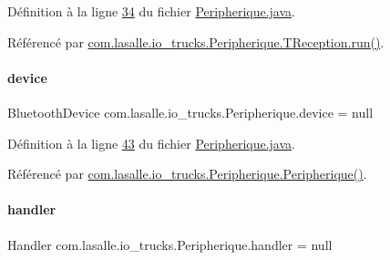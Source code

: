 Définition à la ligne \hyperlink{_peripherique_8java_source_l00034}{34} du fichier \hyperlink{_peripherique_8java_source}{Peripherique.\+java}.



Référencé par \hyperlink{_peripherique_8java_source_l00272}{com.\+lasalle.\+io\+\_\+trucks.\+Peripherique.\+T\+Reception.\+run()}.

\mbox{\label{classcom_1_1lasalle_1_1io__trucks_1_1_peripherique_aa42a263edf31850160d722219115a0ea}} 
\paragraph{\texorpdfstring{device}{device}}
{\footnotesize\ttfamily Bluetooth\+Device com.\+lasalle.\+io\+\_\+trucks.\+Peripherique.\+device = null\hspace{0.3cm}{\ttfamily [private]}}



Définition à la ligne \hyperlink{_peripherique_8java_source_l00043}{43} du fichier \hyperlink{_peripherique_8java_source}{Peripherique.\+java}.



Référencé par \hyperlink{_peripherique_8java_source_l00054}{com.\+lasalle.\+io\+\_\+trucks.\+Peripherique.\+Peripherique()}.

\mbox{\label{classcom_1_1lasalle_1_1io__trucks_1_1_peripherique_afc44cb5a50cb29c450ef962efc735532}} 
\paragraph{\texorpdfstring{handler}{handler}}
{\footnotesize\ttfamily Handler com.\+lasalle.\+io\+\_\+trucks.\+Peripherique.\+handler = null\hspace{0.3cm}{\ttfamily [private]}}



